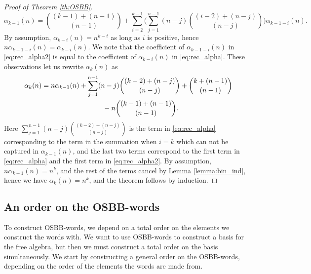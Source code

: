 \documentclass[pdftex]{sigma}
\numberwithin{equation}{section}
\begin{document}
\begin{proof}[Proof of Theorem \ref{th:OSBB}]
 \begin{equation}\label{eq:rec_alpha2}
 \alpha_{k-1}(n) = \binom{(k-1) + (n-1)}{(n-1)} + \sum_{i=2}^{k-1} \Biggl( \sum_{j=1}^{n-1} (n-j) \binom{(i-2) + (n-j)}{(n-j)} \Biggr) \alpha_{k-1-i}(n).
 \end{equation}
 By assumption, $\alpha_{k-i}(n) = n^{k-i}$ as long as $i$ is positive, hence $n\alpha_{k-1-i}(n) = \alpha_{k-i}(n)$. We note that the coefficient of $\alpha_{k-1-i}(n)$ in \eqref{eq:rec_alpha2} is equal to the coefficient of $\alpha_{k-i}(n)$ in \eqref{eq:rec_alpha}. These observations let us rewrite $\alpha_k(n)$ as
 \begin{gather*}
 \alpha_k(n) = n \alpha_{k-1}(n) + \sum_{j=1}^{n-1}(n-j)\binom{(k-2) + (n-j)}{(n-j)} + \binom{k + (n-1)}{(n-1)}\\ \hphantom{\alpha_k(n) =}{}
 - n\binom{(k-1)+(n-1)}{(n-1)}.
 \end{gather*}
 Here $\sum_{j=1}^{n-1}(n-j)\binom{(k-2) + (n-j)}{(n-j)}$ is the term in \eqref{eq:rec_alpha} corresponding to the term in the summation when $i=k$ which can not be captured in $\alpha_{k-1}(n)$, and the last two terms correspond to the first term in \eqref{eq:rec_alpha} and the first term in \eqref{eq:rec_alpha2}. By assumption, $n\alpha_{k-1}(n)=n^k$, and the rest of the terms cancel by Lemma \ref{lemma:bin_ind}, hence we have $\alpha_k(n)=n^k$, and the theorem follows by induction.
\end{proof}

\subsection{An order on the OSBB-words}

To construct OSBB-words, we depend on a total order on the elements we construct the words with. We want to use OSBB-words to construct a basis for the free algebra, but then we must construct a total order on the basis simultaneously. We start by constructing a general order on the OSBB-words, depending on the order of the elements the words are made from.
\end{document}
